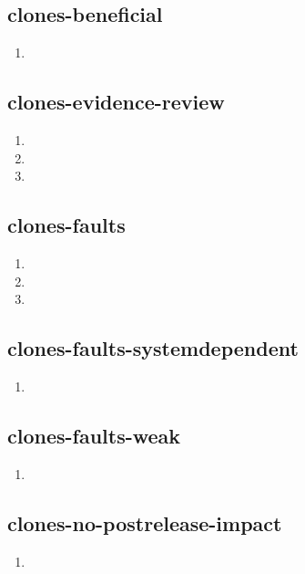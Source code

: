 \documentclass{article}
\begin{document}
\subsection{clones-beneficial}
\begin{enumerate}
\item {}
\end{enumerate}

\subsection{clones-evidence-review}
\begin{enumerate}
\item {}
\item {}
\item {}
\end{enumerate}

\subsection{clones-faults}
\begin{enumerate}
\item {}
\item {}
\item {}
\end{enumerate}

\subsection{clones-faults-systemdependent}
\begin{enumerate}
\item {}
\end{enumerate}

\subsection{clones-faults-weak}
\begin{enumerate}
\item {}
\end{enumerate}

\subsection{clones-no-postrelease-impact}
\begin{enumerate}
\item {}
\end{enumerate}
\end{document}
